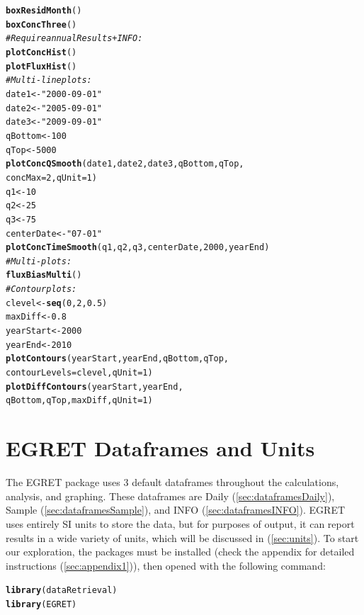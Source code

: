 \documentclass[a4paper,11pt]{article}\usepackage[]{graphicx}\usepackage[]{color}
\makeatletter
\newcommand{\hlnum}[1]{\textcolor[rgb]{0.686,0.059,0.569}{#1}}%
\newcommand{\hlstr}[1]{\textcolor[rgb]{0.192,0.494,0.8}{#1}}%
\newcommand{\hlcom}[1]{\textcolor[rgb]{0.678,0.584,0.686}{\textit{#1}}}%
\newcommand{\hlstd}[1]{\textcolor[rgb]{0.345,0.345,0.345}{#1}}%
\newcommand{\hlkwb}[1]{\textcolor[rgb]{0.69,0.353,0.396}{#1}}%
\newcommand{\hlkwc}[1]{\textcolor[rgb]{0.333,0.667,0.333}{#1}}%
\newcommand{\hlkwd}[1]{\textcolor[rgb]{0.737,0.353,0.396}{\textbf{#1}}}%
\newenvironment{kframe}{%
 \def\at@end@of@kframe{}%
 \ifinner\ifhmode%
  \def\at@end@of@kframe{\end{minipage}}%
  \begin{minipage}{\columnwidth}%
 \fi\fi%
 \def\FrameCommand##1{\hskip\@totalleftmargin \hskip-\fboxsep
 \colorbox{shadecolor}{##1}\hskip-\fboxsep
     \hskip-\linewidth \hskip-\@totalleftmargin \hskip\columnwidth}%
 \MakeFramed {\advance\hsize-\width
   \@totalleftmargin\z@ \linewidth\hsize
   \@setminipage}}%
 {\par\unskip\endMakeFramed%
 \at@end@of@kframe}
\newenvironment{knitrout}{}{} %
\makeatother
\begin{document}
\begin{knitrout}
\begin{kframe}
\begin{alltt}
\hlkwd{boxResidMonth}\hlstd{()}
\hlkwd{boxConcThree}\hlstd{()}
\hlcom{#Require annualResults + INFO:}
\hlkwd{plotConcHist}\hlstd{()}
\hlkwd{plotFluxHist}\hlstd{()}
\hlcom{# Multi-line plots:}
\hlstd{date1} \hlkwb{<-} \hlstr{"2000-09-01"}
\hlstd{date2} \hlkwb{<-} \hlstr{"2005-09-01"}
\hlstd{date3} \hlkwb{<-} \hlstr{"2009-09-01"}
\hlstd{qBottom}\hlkwb{<-}\hlnum{100}
\hlstd{qTop}\hlkwb{<-}\hlnum{5000}
\hlkwd{plotConcQSmooth}\hlstd{(date1, date2, date3, qBottom, qTop,}
                   \hlkwc{concMax}\hlstd{=}\hlnum{2}\hlstd{,}\hlkwc{qUnit}\hlstd{=}\hlnum{1}\hlstd{)}
\hlstd{q1} \hlkwb{<-} \hlnum{10}
\hlstd{q2} \hlkwb{<-} \hlnum{25}
\hlstd{q3} \hlkwb{<-} \hlnum{75}
\hlstd{centerDate} \hlkwb{<-} \hlstr{"07-01"}
\hlkwd{plotConcTimeSmooth}\hlstd{(q1, q2, q3, centerDate,} \hlnum{2000}\hlstd{, yearEnd)}
\hlcom{# Multi-plots:}
\hlkwd{fluxBiasMulti}\hlstd{()}
\hlcom{#Contour plots:}
\hlstd{clevel}\hlkwb{<-}\hlkwd{seq}\hlstd{(}\hlnum{0}\hlstd{,}\hlnum{2}\hlstd{,}\hlnum{0.5}\hlstd{)}
\hlstd{maxDiff}\hlkwb{<-}\hlnum{0.8}
\hlstd{yearStart} \hlkwb{<-} \hlnum{2000}
\hlstd{yearEnd} \hlkwb{<-} \hlnum{2010}
\hlkwd{plotContours}\hlstd{(yearStart,yearEnd,qBottom,qTop,}
             \hlkwc{contourLevels} \hlstd{= clevel,}\hlkwc{qUnit}\hlstd{=}\hlnum{1}\hlstd{)}
\hlkwd{plotDiffContours}\hlstd{(yearStart,yearEnd,}
                 \hlstd{qBottom,qTop,maxDiff,}\hlkwc{qUnit}\hlstd{=}\hlnum{1}\hlstd{)}
\end{alltt}
\end{kframe}
\end{knitrout}



\section{EGRET Dataframes and Units}
\label{sec:dataframes}
The EGRET package uses 3 default dataframes throughout the calculations, analysis, and graphing. These dataframes are Daily (\ref{sec:dataframesDaily}), Sample (\ref{sec:dataframesSample}), and INFO (\ref{sec:dataframesINFO}). EGRET uses entirely SI units to store the data, but for purposes of output, it can report results in a wide variety of units, which will be discussed in (\ref{sec:units}). To start our exploration, the packages must be installed (check the appendix for detailed instructions (\ref{sec:appendix1})), then opened with the following command:

\begin{knitrout}
\color{fgcolor}\begin{kframe}
\begin{alltt}
\hlkwd{library}\hlstd{(dataRetrieval)}
\hlkwd{library}\hlstd{(EGRET)}
\end{alltt}
\end{kframe}
\end{knitrout}
\end{document}
